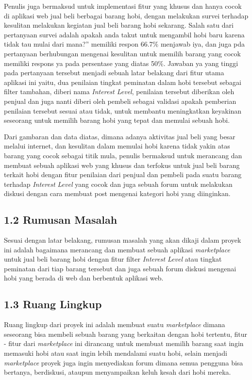 \documentclass[a4paper]{article}
\begin{document}
Penulis juga bermaksud untuk implementasi fitur yang khusus dan hanya cocok di aplikasi web jual beli berbagai barang hobi, dengan melakukan survei terhadap kesulitan melakukan kegiatan jual beli barang hobi sekarang. Salah satu dari pertanyaan survei adalah apakah anda takut untuk mengambil hobi baru karena tidak tau mulai dari mana?” memiliki respon 66.7\% menjawab iya, dan juga pda pertanyaan berhubungan mengenai kesulitan untuk memilih barang yang cocok memiliki respons ya pada persentase yang diatas 50\%. Jawaban ya yang tinggi pada pertanyaan tersebut menjadi sebuah latar belakang dari fitur utama aplikasi ini yaitu, dua penilaian tingkat peminatan dalam hobi tersebut sebagai filter tambahan, diberi nama \textit{Interest Level}, penilaian tersebut diberikan oleh penjual dan juga nanti diberi oleh pembeli sebagai validasi apakah pemberian penilaian tersebut sesuai atau tidak, untuk membantu meningkatkan keyakinan seseorang untuk memilih barang hobi yang tepat dan memulai sebuah hobi.


Dari gambaran dan data diatas, dimana adanya aktivitas jual beli yang besar melalui internet, dan kesulitan dalam memulai hobi karena tidak yakin atas barang yang cocok sebagai titik mula, penulis bermaksud untuk merancang dan membuat sebuah aplikasi web yang khusus dan terfokus untuk jual beli barang terkait hobi dengan fitur penilaian dari penjual dan pembeli pada suatu barang terhadap \textit{Interest Level} yang cocok dan juga sebuah forum untuk melakukan diskusi dengan cara membuat post mengenai kategori hobi yang diinginkan. 


\subsection*{1.2 Rumusan Masalah}

Sesuai dengan latar belakang, rumusan masalah yang akan dikaji dalam proyek ini adalah bagaimana merancang dan membuat sebuah aplikasi \textit{marketplace} untuk jual beli barang hobi dengan fitur filter \textit{Interest Level} atau tingkat peminatan dari tiap barang tersebut dan juga sebuah forum diskusi mengenai hobi yang berada di web dan berbentuk aplikasi web.

\subsection*{1.3 Ruang Lingkup}
Ruang lingkup dari proyek ini adalah membuat suatu \textit{marketplace} dimana seseorang bisa membeli sebuah barang yang berkaitan dengan hobi tertentu, fitur - fitur dari \textit{marketplace} ini dirancang untuk membuat memilih barang saat ingin memasuki hobi atau saat ingin lebih mendalami suatu hobi, selain menjadi \textit{marketplace} proyek juga ingin menyediakan forum dimana semua pengguna bisa bertanya, berdiskusi, ataupun menyampaikan keluh kesah dari hobi mereka.
\end{document}
